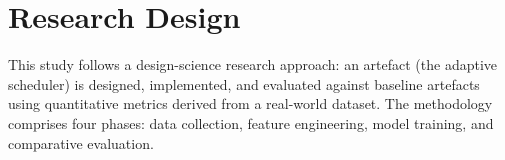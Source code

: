 \section{Research Design}

This study follows a design-science research approach: an artefact (the adaptive scheduler) is
designed, implemented, and evaluated against baseline artefacts using quantitative metrics derived
from a real-world dataset. The methodology comprises four phases: data collection, feature
engineering, model training, and comparative evaluation.
